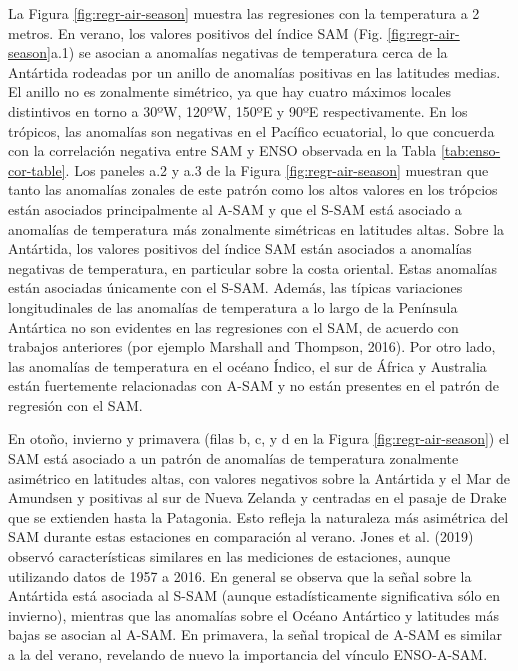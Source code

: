 \documentclass[12pt,oneside]{reedthesis}
\begin{document}
La Figura \ref{fig:regr-air-season} muestra las regresiones con la temperatura a 2 metros.
En verano, los valores positivos del índice SAM (Fig. \ref{fig:regr-air-season}a.1) se asocian a anomalías negativas de temperatura cerca de la Antártida rodeadas por un anillo de anomalías positivas en las latitudes medias.
El anillo no es zonalmente simétrico, ya que hay cuatro máximos locales distintivos en torno a 30ºW, 120ºW, 150ºE y 90ºE respectivamente.
En los trópicos, las anomalías son negativas en el Pacífico ecuatorial, lo que concuerda con la correlación negativa entre SAM y ENSO observada en la Tabla \ref{tab:enso-cor-table}.
Los paneles a.2 y a.3 de la Figura \ref{fig:regr-air-season} muestran que tanto las anomalías zonales de este patrón como los altos valores en los trópcios están asociados principalmente al A-SAM y que el S-SAM está asociado a anomalías de temperatura más zonalmente simétricas en latitudes altas.
Sobre la Antártida, los valores positivos del índice SAM están asociados a anomalías negativas de temperatura, en particular sobre la costa oriental.
Estas anomalías están asociadas únicamente con el S-SAM.
Además, las típicas variaciones longitudinales de las anomalías de temperatura a lo largo de la Península Antártica no son evidentes en las regresiones con el SAM, de acuerdo con trabajos anteriores (por ejemplo Marshall and Thompson, 2016).
Por otro lado, las anomalías de temperatura en el océano Índico, el sur de África y Australia están fuertemente relacionadas con A-SAM y no están presentes en el patrón de regresión con el SAM.

En otoño, invierno y primavera (filas b, c, y d en la Figura \ref{fig:regr-air-season}) el SAM está asociado a un patrón de anomalías de temperatura zonalmente asimétrico en latitudes altas, con valores negativos sobre la Antártida y el Mar de Amundsen y positivas al sur de Nueva Zelanda y centradas en el pasaje de Drake que se extienden hasta la Patagonia.
Esto refleja la naturaleza más asimétrica del SAM durante estas estaciones en comparación al verano.
Jones et al. (2019) observó características similares en las mediciones de estaciones, aunque utilizando datos de 1957 a 2016.
En general se observa que la señal sobre la Antártida está asociada al S-SAM (aunque estadísticamente significativa sólo en invierno), mientras que las anomalías sobre el Océano Antártico y latitudes más bajas se asocian al A-SAM.
En primavera, la señal tropical de A-SAM es similar a la del verano, revelando de nuevo la importancia del vínculo ENSO-A-SAM.
\end{document}
